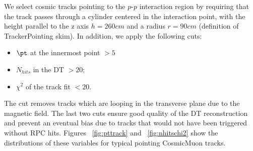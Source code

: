 We select cosmic tracks pointing to the $p$-$p$ interaction
region by requiring that the track passes through a cylinder 
centered in the interaction point, with the height parallel 
to the z axis $h = 260 cm$ and a radius $r = 90 cm$ 
(definition of TrackerPointing skim). In addition, we apply the following 
cuts:
\begin{itemize}
\item
$\pt$ at the innermost point $ > 5$\GeVc 
\item
$N_{hits}$ in the DT $ > 20 $;
\item
$\chi^2$ of the track fit $ < 20 $.
\end{itemize}
The \pt cut removes tracks which are
looping in the transverse plane due 
to the magnetic field. The last two cuts 
ensure good quality of the DT reconstruction 
and prevent an eventual bias due to 
tracks that would not have been triggered 
without RPC hits.
Figures ~\ref{fig:pttrack} and ~\ref{fig:nhitschi2} show 
the distributions of these variables for typical pointing
CosmicMuon tracks.

